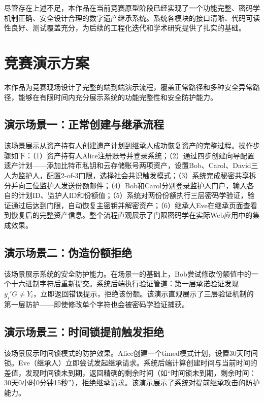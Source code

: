 \documentclass[UTF8,a4paper,zihao=-4,openany]{ctexrep}
\begin{document}
尽管存在上述不足，本作品在当前竞赛原型阶段已经实现了一个功能完整、密码学机制正确、安全设计合理的数字遗产继承系统。系统各模块的接口清晰、代码可读性良好、测试覆盖充分，为后续的工程化迭代和学术研究提供了扎实的基础。

\section{竞赛演示方案}

本作品为竞赛现场设计了完整的端到端演示流程，覆盖正常路径和多种安全异常路径，能够在有限时间内充分展示系统的功能完整性和安全防护能力。

\subsection{演示场景一：正常创建与继承流程}

该场景展示从资产持有人创建遗产计划到继承人成功恢复资产的完整过程。操作步骤如下：（1）资产持有人Alice注册账号并登录系统；（2）通过四步创建向导配置遗产计划——添加比特币私钥和云存储账号两项资产，设置Bob、Carol、David三人为监护人，配置2-of-3门限，选择社会共识触发模式；（3）系统完成秘密共享拆分并向三位监护人发送份额邮件；（4）Bob和Carol分别登录监护人门户，输入各自的计划ID、监护人ID和份额值；（5）系统对两份份额执行三层密码学验证，验证通过后达到门限，自动恢复主密钥并解密资产；（6）继承人Eve在继承页面查看到恢复后的完整资产信息。整个流程直观展示了门限密码学在实际Web应用中的集成效果。

\subsection{演示场景二：伪造份额拒绝}

该场景展示系统的安全防护能力。在场景一的基础上，Bob尝试修改份额值中的一个十六进制字符后重新提交。系统后端执行验证管道：第一层承诺验证发现$y_i'G \neq Y_i$，立即返回错误提示，拒绝该份额。该演示直观展示了三层验证机制的第一层防护——即使修改单个字符也会被密码学验证捕获。

\subsection{演示场景三：时间锁提前触发拒绝}

该场景展示时间锁模式的防护效果。Alice创建一个timed模式计划，设置30天时间锁。Eve（继承人）立即尝试发起继承请求。系统后端计算创建时间与当前时间的差值，发现时间锁未到期，返回精确的剩余时间（如“时间锁未到期，剩余时间：30天0小时0分钟15秒”），拒绝继承请求。该演示展示了系统对提前继承攻击的防护能力。
\end{document}
